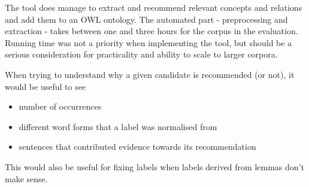 \documentclass[a4paper]{report}
\newcommand{\todo}[1]{\footnote{{\color{red} TODO: #1}}}
\begin{document}
The tool does manage to extract and recommend relevant concepts and relations and add them to an OWL ontology.
The automated part - preprocessing and extraction - takes between one and three hours for the corpus in the evaluation.
Running time was not a priority when implementing the tool, but should be a serious consideration for practicality and ability to scale to larger corpora.

When trying to understand why a given candidate is recommended (or not), it would be useful to see

\begin{itemize}
\item number of occurrences
\item different word forms that a label was normalised from
\item sentences that contributed evidence towards its recommendation
\end{itemize}

This would also be useful for fixing labels when labels derived from lemmas don't make sense.



\end{document}
